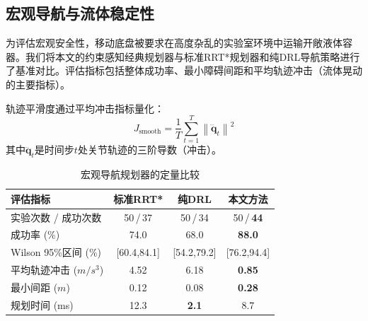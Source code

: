 \begin{table}[!t]
\caption{状态同步目标与提供的实测汇总结果}
\label{tab:sync_illustrative}
\centering
{}
\end{table}

\subsection{宏观导航与流体稳定性}
\label{subsec:exp_macro_benchmarks}

为评估宏观安全性，移动底盘被要求在高度杂乱的实验室环境中运输开敞液体容器。我们将本文的约束感知经典规划器与标准RRT*规划器和纯DRL导航策略进行了基准对比。评估指标包括整体成功率、最小障碍间距和平均轨迹冲击（流体晃动的主要指标）。

轨迹平滑度通过平均冲击指标量化：
\begin{equation}
    J_{\text{smooth}} = \frac{1}{T} \sum_{t=1}^{T} \left\| \dddot{\mathbf{q}}_t \right\|^2
\end{equation}
其中$\dddot{\mathbf{q}}_t$是时间步$t$处关节轨迹的三阶导数（冲击）。

\begin{table}[!t]
\renewcommand{\arraystretch}{1.3}
\caption{宏观导航规划器的定量比较}
\label{tab:navigation_metrics}
\centering
\begin{tabular}{lccc}
\hline\hline
\textbf{评估指标} & \textbf{标准RRT*} & \textbf{纯DRL} & \textbf{本文方法} \\ \hline
实验次数 / 成功次数 & 50\,/\,37 & 50\,/\,34 & 50\,/\,\textbf{44} \\
成功率 (\%) & 74.0 & 68.0 & \textbf{88.0} \\
Wilson 95\%区间 (\%) & [60.4,84.1] & [54.2,79.2] & [76.2,94.4] \\
平均轨迹冲击 ($m/s^3$) & 4.52 & 6.18 & \textbf{0.85} \\
最小间距 ($m$) & 0.12 & 0.08 & \textbf{0.28} \\
规划时间 (ms) & 12.3 & \textbf{2.1} & 8.7 \\ \hline\hline
\end{tabular}
\end{table}

